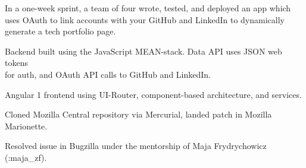 \documentclass[]{deedy-resume-openfont}
\begin{document}
\begin{minipage}[t]{0.71\textwidth}
\vspace{0.6mm}
In a one-week sprint, a team of four wrote, tested, and deployed an app which uses OAuth
to link accounts with your GitHub and LinkedIn to dynamically generate a tech portfolio
page.
\vspace{1.5mm} %
\begin{tightemize}
\item Backend built using the JavaScript MEAN-stack. Data API uses JSON web tokens \\
for
auth, and OAuth API calls to GitHub and LinkedIn.
\item Angular 1 frontend using UI-Router, component-based architecture, and services. \\
\end{tightemize}
\sectionsep
\vspace{2mm}


\vspace{0.6mm}
Cloned Mozilla Central repository via Mercurial, landed patch in Mozilla Marionette.
\vspace{1.5mm}
\begin{tightemize}
\item Resolved issue in Bugzilla under the mentorship of Maja Frydrychowicz (:maja\_zf).
\end{tightemize}
\sectionsep






\end{minipage}
\end{document}
